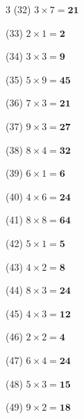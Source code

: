 \documentclass[a4paper, 11pt]{ltjsarticle}
\begin{document}
\begin{multicols*}{3}
\noindent (32) \quad $3 \times 7 = \mathbf{21}$
\vspace*{\fill}

\noindent (33) \quad $2 \times 1 = \mathbf{2}$
\vspace*{\fill}

\noindent (34) \quad $3 \times 3 = \mathbf{9}$
\vspace*{\fill}

\noindent (35) \quad $5 \times 9 = \mathbf{45}$
\vspace*{\fill}

\noindent (36) \quad $7 \times 3 = \mathbf{21}$
\vspace*{\fill}
\columnbreak

\noindent (37) \quad $9 \times 3 = \mathbf{27}$
\vspace*{\fill}

\noindent (38) \quad $8 \times 4 = \mathbf{32}$
\vspace*{\fill}

\noindent (39) \quad $6 \times 1 = \mathbf{6}$
\vspace*{\fill}

\noindent (40) \quad $4 \times 6 = \mathbf{24}$
\vspace*{\fill}

\noindent (41) \quad $8 \times 8 = \mathbf{64}$
\vspace*{\fill}

\noindent (42) \quad $5 \times 1 = \mathbf{5}$
\vspace*{\fill}

\noindent (43) \quad $4 \times 2 = \mathbf{8}$
\vspace*{\fill}

\noindent (44) \quad $8 \times 3 = \mathbf{24}$
\vspace*{\fill}

\noindent (45) \quad $4 \times 3 = \mathbf{12}$
\vspace*{\fill}

\noindent (46) \quad $2 \times 2 = \mathbf{4}$
\vspace*{\fill}

\noindent (47) \quad $6 \times 4 = \mathbf{24}$
\vspace*{\fill}

\noindent (48) \quad $5 \times 3 = \mathbf{15}$
\vspace*{\fill}
\columnbreak

\noindent (49) \quad $9 \times 2 = \mathbf{18}$
\vspace*{\fill}


\end{multicols*}
\end{document}
